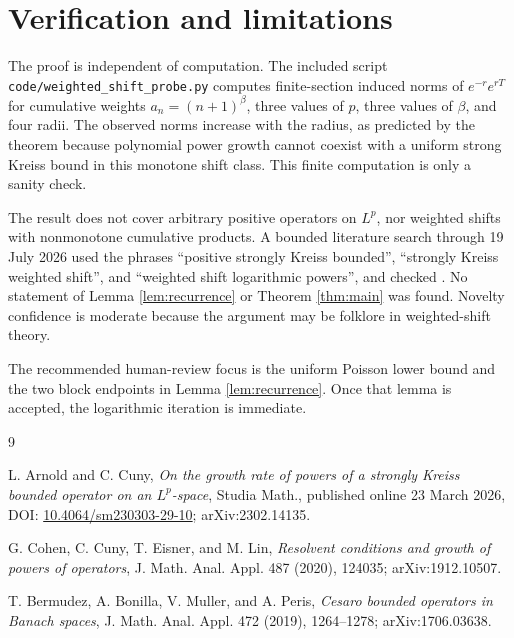 \documentclass[11pt]{article}
\begin{document}
\section{Verification and limitations}

The proof is independent of computation.  The included script
\texttt{code/weighted\_shift\_probe.py} computes finite-section induced norms
of $e^{-r}e^{rT}$ for cumulative weights $a_n=(n+1)^\beta$, three values of
$p$, three values of $\beta$, and four radii.  The observed norms increase
with the radius, as predicted by the theorem because polynomial power growth
cannot coexist with a uniform strong Kreiss bound in this monotone shift
class.  This finite computation is only a sanity check.

The result does not cover arbitrary positive operators on $L^p$, nor weighted
shifts with nonmonotone cumulative products.  A bounded literature search
through 19 July 2026 used the phrases ``positive strongly Kreiss bounded'',
``strongly Kreiss weighted shift'', and ``weighted shift logarithmic powers'',
and checked \cite{ArnoldCuny,CCEL,BermudezEtAl}.  No statement of Lemma
\ref{lem:recurrence} or Theorem \ref{thm:main} was found.  Novelty confidence
is moderate because the argument may be folklore in weighted-shift theory.

The recommended human-review focus is the uniform Poisson lower bound and the
two block endpoints in Lemma \ref{lem:recurrence}.  Once that lemma is
accepted, the logarithmic iteration is immediate.

\begin{thebibliography}{9}

L. Arnold and C. Cuny,
\emph{On the growth rate of powers of a strongly Kreiss bounded operator on
an $L^p$-space}, Studia Math., published online 23 March 2026,
DOI: \href{https://doi.org/10.4064/sm230303-29-10}{10.4064/sm230303-29-10};
arXiv:2302.14135.

G. Cohen, C. Cuny, T. Eisner, and M. Lin,
\emph{Resolvent conditions and growth of powers of operators},
J. Math. Anal. Appl. 487 (2020), 124035; arXiv:1912.10507.

T. Bermudez, A. Bonilla, V. Muller, and A. Peris,
\emph{Cesaro bounded operators in Banach spaces},
J. Math. Anal. Appl. 472 (2019), 1264--1278; arXiv:1706.03638.

\end{thebibliography}
\end{document}
